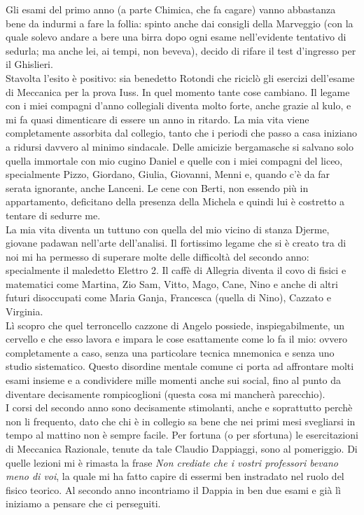 Gli esami del primo anno (a parte Chimica, che fa cagare) vanno abbastanza bene da indurmi a fare la follia: spinto anche dai consigli della Marveggio (con la quale solevo andare a bere una birra dopo ogni esame nell'evidente tentativo di sedurla; ma anche lei, ai tempi, non beveva), decido di rifare il test d'ingresso per il Ghislieri.\\
Stavolta l'esito \`e positivo: sia benedetto Rotondi che ricicl\`o gli esercizi dell'esame di Meccanica per la prova Iuss. In quel momento tante cose cambiano. Il legame con i miei compagni d'anno collegiali diventa molto forte, anche grazie al kulo, e mi fa quasi dimenticare di essere un anno in ritardo. La mia vita viene completamente assorbita dal collegio, tanto che i periodi che passo a casa iniziano a ridursi davvero al minimo sindacale. Delle amicizie bergamasche si salvano solo quella immortale con mio cugino Daniel e quelle con i miei compagni del liceo, specialmente Pizzo, Giordano, Giulia, Giovanni, Menni e, quando c'\`e da far serata ignorante, anche Lanceni. Le cene con Berti, non essendo pi\`u in appartamento, deficitano della presenza della Michela e quindi lui \`e costretto a tentare di sedurre me.\\
La mia vita diventa un tuttuno con quella del mio vicino di stanza Djerme, giovane padawan nell'arte dell'analisi. Il fortissimo legame che si \`e creato tra di noi mi ha permesso di superare molte delle difficolt\`a del secondo anno: specialmente il maledetto Elettro 2. Il caff\`e di Allegria diventa il covo di fisici e matematici come Martina, Zio Sam, Vitto, Mago, Cane, Nino e anche di altri futuri disoccupati come Maria Ganja, Francesca (quella di Nino),  Cazzato e Virginia.\\
L\`i scopro che quel terroncello cazzone di Angelo possiede, inspiegabilmente, un cervello e che esso lavora e impara le cose esattamente come lo fa il mio: ovvero completamente a caso, senza una particolare tecnica mnemonica e senza uno studio sistematico. Questo disordine mentale comune ci porta ad affrontare molti esami insieme e a condividere mille momenti anche sui social, fino al punto da diventare decisamente rompicoglioni (questa cosa mi mancher\`a parecchio).\\
I corsi del secondo anno sono decisamente stimolanti, anche e soprattutto perch\`e non li frequento, dato che chi \`e in collegio sa bene che nei primi mesi svegliarsi in tempo al mattino non \`e sempre facile. Per fortuna (o per sfortuna) le esercitazioni di Meccanica Razionale, tenute da tale Claudio Dappiaggi, sono al pomeriggio. Di quelle lezioni mi \`e rimasta la frase \emph{Non crediate che i vostri professori bevano meno di voi}, la quale mi ha fatto capire di essermi ben instradato nel ruolo del fisico teorico. Al secondo anno incontriamo il Dappia in ben due esami e gi\`a l\`i iniziamo a pensare che ci perseguiti.\\
